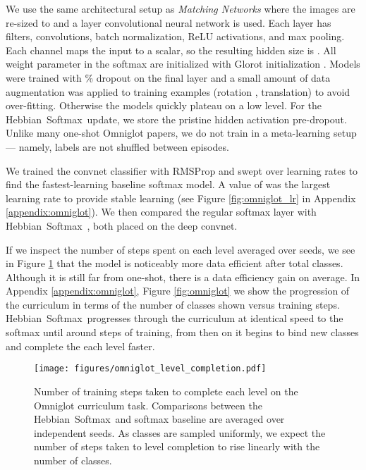 \documentclass{article} \usepackage{hyperref}
\newcommand{\model}{\hbox{Hebbian Softmax }}
\begin{document}
We use the same architectural setup as \textit{Matching Networks} \citep{vinyals2016matching} where the images are re-sized to  and a  layer convolutional neural network is used. Each layer has  filters,  convolutions, batch normalization, ReLU activations, and  max pooling. Each channel maps the input to a scalar, so the resulting hidden size is . All weight parameter in the softmax are initialized with Glorot initialization \citep{glorot2010understanding}. Models were trained with \% dropout on the final layer and a small amount of data augmentation was applied to training examples (rotation , translation) to avoid over-fitting. Otherwise the models quickly plateau on a low level. For the \model update, we store the pristine hidden activation pre-dropout. Unlike many one-shot Omniglot papers, we do not train in a meta-learning setup --- namely, labels are not shuffled between episodes.

We trained the convnet classifier with RMSProp and swept over learning rates  to find the fastest-learning baseline softmax model. A value of  was the largest learning rate to provide stable learning (see Figure \ref{fig:omniglot_lr} in Appendix \ref{appendix:omniglot}). We then compared the regular softmax layer with \model, both placed on the deep convnet.

If we inspect the number of steps spent on each level averaged over  seeds, we see in Figure \ref{fig:omniglot_levels} that the model is noticeably more data efficient after  total classes. Although it is still far from one-shot, there is a  data efficiency gain on average. In Appendix \ref{appendix:omniglot}, Figure \ref{fig:omniglot} we show the progression of the curriculum in terms of the number of classes shown versus training steps. \model progresses through the curriculum at identical speed to the softmax until around  steps of training, from then on it begins to bind new classes and complete the each level faster.


\begin{figure}
    \centering
    \texttt{[image: figures/omniglot\_level\_completion.pdf]}
    \caption{Number of training steps taken to complete each level on the Omniglot curriculum task. Comparisons between the \model and softmax baseline are averaged over  independent seeds. As classes are sampled uniformly, we expect the number of steps taken to level completion to rise linearly with the number of classes.}
    \label{fig:omniglot_levels}
\end{figure}
\end{document}
